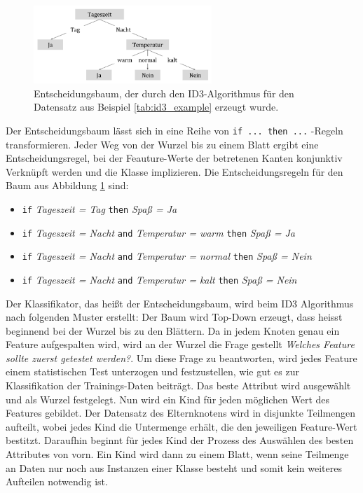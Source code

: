 \begin{figure}[h]
	\centering
	\includegraphics[width=0.6\textwidth]{bilder/id3tree.png}
	\caption{Entscheidungsbaum, der durch den ID3-Algorithmus für den Datensatz aus Beispiel \ref{tab:id3_example} erzeugt wurde.}
	\label{img:id3tree}
\end{figure}

Der Entscheidungsbaum lässt sich in eine Reihe von \texttt{if ... then ...}
-Regeln transformieren. Jeder Weg von der Wurzel bis zu einem Blatt ergibt eine Entscheidungsregel, bei der Feauture-Werte der betretenen Kanten konjunktiv Verknüpft werden und die Klasse implizieren. Die Entscheidungsregeln für den Baum aus Abbildung 	\ref{img:id3tree} sind: \cite[S. 134]{machine_marsland}

\begin{itemize}
\item \texttt{if}  \emph{Tageszeit = Tag} \texttt{then} \emph{Spaß = Ja}
\item \texttt{if}  \emph{Tageszeit = Nacht} \texttt{and} \emph{Temperatur = warm} \texttt{then} \emph{Spaß = Ja}
\item \texttt{if}  \emph{Tageszeit = Nacht} \texttt{and} \emph{Temperatur = normal} \texttt{then} \emph{Spaß = Nein}
\item \texttt{if}  \emph{Tageszeit = Nacht} \texttt{and} \emph{Temperatur = kalt} \texttt{then} \emph{Spaß = Nein}
\end{itemize}

Der Klassifikator, das heißt der Entscheidungsbaum,  wird beim ID3 Algorithmus nach folgenden Muster erstellt:
Der Baum wird Top-Down erzeugt, dass heisst beginnend bei der Wurzel bis zu den Blättern. Da in jedem Knoten genau ein Feature  aufgespalten wird, wird an der Wurzel die Frage gestellt \glqq \emph{Welches Feature sollte zuerst getestet werden?}\grqq . Um diese Frage zu beantworten, wird jedes Feature einem statistischen Test unterzogen und festzustellen, wie \glqq gut\grqq{} es zur Klassifikation der Trainings-Daten beiträgt. Das \glqq beste\grqq{} Attribut wird ausgewählt und als Wurzel festgelegt. Nun wird ein Kind für jeden möglichen Wert des Features gebildet. Der Datensatz des Elternknotens wird in disjunkte Teilmengen aufteilt, wobei jedes Kind die Untermenge erhält, die den jeweiligen Feature-Wert bestitzt. Daraufhin beginnt für jedes Kind der Prozess des Auswählen des \glqq besten\grqq{} Attributes von vorn. Ein Kind wird dann zu einem Blatt, wenn seine Teilmenge an Daten nur noch aus Instanzen einer Klasse besteht und somit kein weiteres Aufteilen notwendig ist.\cite[S. 55]{machine_mitchell}

